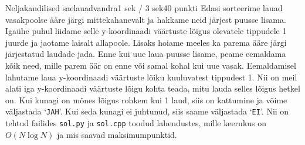 \begin{yl}{3}{Neljakandilised saelauad}{vandra}{1 sek / 3 sek}{40 punkti}
  Edasi sorteerime lauad vasakpoolse ääre järgi mittekahanevalt
  ja hakkame neid järjest puusse lisama. Igaühe puhul liidame selle y-koordinaadi väärtuste lõigus olevatele
  tippudele 1 juurde ja jaotame laisalt allapoole. Lisaks hoiame meeles ka parema ääre järgi
  järjestatud laudade jada. Enne kui uue laua puusse lisame, peame eemaldama kõik need, mille parem
  äär on enne või samal kohal kui uue vasak. Eemaldamisel lahutame laua y-koordinaadi väärtuste lõiku
  kuuluvatest tippudest 1. Nii on meil alati iga y-koordinaadi väärtuste lõigu kohta teada, mitu lauda
  selles lõigus hetkel on. Kui kunagi on mõnes lõigus rohkem kui 1 laud, siis on kattumine ja
  võime väljastada `\verb/JAH/'. Kui seda kunagi ei juhtunud, siis saame väljastada `\verb/EI/'.
  Nii on tehtud failides \verb/sol.py/ ja \verb/sol.cpp/ toodud lahendustes, mille
  keerukus on $O(N \log N)$ ja mis saavad maksimumpunktid.
\end{yl}
